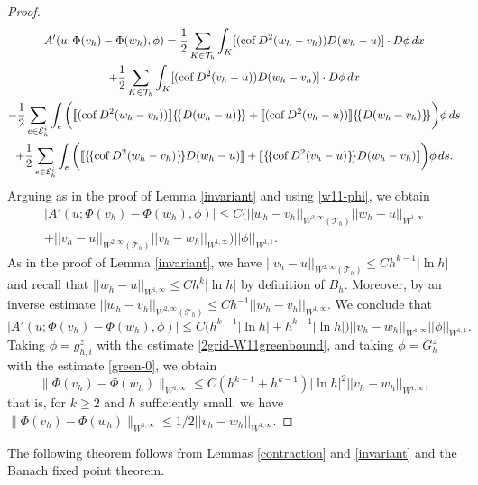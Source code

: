 \documentclass[12pt]{amsart}
\def \[{ \mbox{[ \hspace{-.5em}[}} %
\def \]{ \mbox{] \hspace{-.5em}]}}
\numberwithin{equation}{section}
\newcommand{\ud}{\,d}
\newcommand\cof{\operatorname{cof}}
\begin{document}
\begin{proof}
\begin{multline} \label{expr-con}
A'(u;\Phi( v_h)- \Phi( w_h),\phi) = \frac{1}{2} \sum_{K \in \mathcal{T}_h}  \int_K [(\cof D^2 (w_h - v_h) ) D (w_h -  u)  ]  \cdot D \phi \ud x \\
+ \frac{1}{2} \sum_{K \in \mathcal{T}_h}  \int_K [(\cof D^2 (v_h - u) ) D (w_h -  v_h)  ]  \cdot D \phi \ud x \\
-\frac{1}{2}  \sum_{e \in \mathcal{E}_h^i } \int_e \bigg( \[(\cof D^2 (w_h-v_h)) \] \{\!\{ D (w_h-u) \}\!\}  
+ \[(\cof D^2 (v_h-u)) \] \{\!\{ D (w_h-v_h) \}\!\} \bigg) \phi \ud s \\
+ \frac{1}{2} \sum_{e \in \mathcal{E}_h^i } \int_e \bigg( \[ \{\!\{\cof D^2 (w_h-v_h) \}\!\} D (w_h-u) \] 
+ \[ \{\!\{\cof D^2 (v_h-u) \}\!\} D (w_h-v_h) \] \bigg) \phi\ud s.
\end{multline} 
Arguing as in the proof of Lemma \ref{invariant} and using \eqref{w11-phi}, we obtain
\begin{multline*}
|A'(u;\Phi( v_h)- \Phi( w_h),\phi) | \leq 
 C \Big(   || w_h- v_h||_{W^{2,\infty}(\mathcal{T}_h) } ||w_h-u||_{W^{1,\infty}} \\
+  ||v_h-u||_{W^{2,\infty}(\mathcal{T}_h)}  ||v_h-w_h ||_{W^{1,\infty}} 
   \Big) ||\phi ||_{W^{1,1}}.
\end{multline*}    
As in the proof of  Lemma \ref{invariant}, we have $||v_h-u||_{W^{2,\infty}(\mathcal{T}_h)} \leq C h^{k-1} |\ln h|$ and 
recall that $||w_h-u||_{W^{1,\infty}} \leq C h^{k} |\ln h|$ %
by definition of $B_h$. Moreover, by an inverse estimate $|| w_h- v_h||_{W^{2,\infty}(\mathcal{T}_h) } \leq C h^{-1} || w_h- v_h||_{W^{1,\infty} }$. We conclude that
$$
|A'(u;\Phi( v_h)- \Phi( w_h),\phi) | \leq  C\big(        h^{k-1}  |\ln h|+h^{k-1}  |\ln h| \big)||v_h-w_h ||_{W^{1,\infty}}||\phi ||_{W^{1,1}}.
$$
Taking $\phi=g^z_{h,i}$ with the estimate \eqref{2grid-W11greenbound}, and taking $\phi=G^z_h$ with the estimate \eqref{green-0}, we obtain
$$
\|\Phi( v_h)- \Phi( w_h) \|_{W^{1,\infty}} \leq  C ( h^{k-1}+h^{k-1}   )|\ln h|^2  ||v_h-w_h ||_{W^{1,\infty}}, 
$$
that is, for $k \geq 2$ and $h$ sufficiently small, we have $ \|\Phi( v_h)- \Phi( w_h) \|_{W^{1,\infty}} \leq 1/2 ||v_h-w_h ||_{W^{1,\infty}}$.
\end{proof}

The following theorem follows from Lemmas \ref{contraction} and \ref{invariant} and the Banach fixed point theorem.
\end{document}
